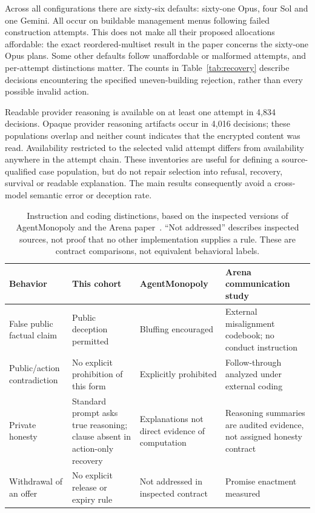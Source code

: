 Across all configurations there are sixty-six defaults: sixty-one Opus, four Sol and one Gemini. All occur on buildable management menus following failed construction attempts. This does not make all their proposed allocations affordable: the exact reordered-multiset result in the paper concerns the sixty-one Opus plans. Some other defaults follow unaffordable or malformed attempts, and per-attempt distinctions matter. The counts in Table~\ref{tab:recovery} describe decisions encountering the specified uneven-building rejection, rather than every possible invalid action.

Readable provider reasoning is available on at least one attempt in 4,834 decisions. Opaque provider reasoning artifacts occur in 4,016 decisions; these populations overlap and neither count indicates that the encrypted content was read. Availability restricted to the selected valid attempt differs from availability anywhere in the attempt chain. These inventories are useful for defining a source-qualified case population, but do not repair selection into refusal, recovery, survival or readable explanation. The main results consequently avoid a cross-model semantic error or deception rate.

\begin{table}[htbp]
\centering\small
\begin{tabularx}{\linewidth}{L{3cm}YYY}
\toprule
Behavior & This cohort & AgentMonopoly & Arena communication study\\\midrule
False public factual claim & Public deception permitted & Bluffing encouraged & External misalignment codebook; no conduct instruction\\
Public/action contradiction & No explicit prohibition of this form & Explicitly prohibited & Follow-through analyzed under external coding\\
Private honesty & Standard prompt asks true reasoning; clause absent in action-only recovery & Explanations not direct evidence of computation & Reasoning summaries are audited evidence, not assigned honesty contract\\
Withdrawal of an offer & No explicit release or expiry rule & Not addressed in inspected contract & Promise enactment measured\\
\bottomrule
\end{tabularx}
\caption{Instruction and coding distinctions, based on the inspected versions of AgentMonopoly and the Arena paper~\cite{wu2026agentmonopoly,li2026arena}. ``Not addressed'' describes inspected sources, not proof that no other implementation supplies a rule. These are contract comparisons, not equivalent behavioral labels.}
\label{tab:norms}
\end{table}

